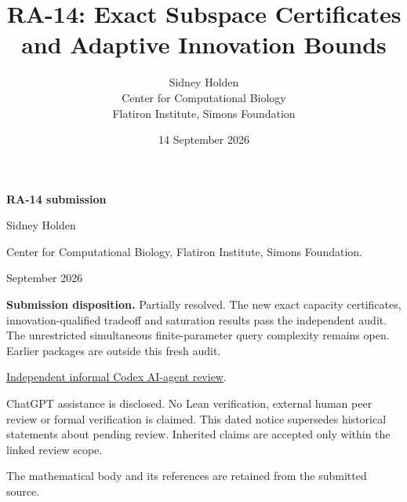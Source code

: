 \documentclass[11pt]{article}
\title{RA-14: Exact Subspace Certificates and Adaptive Innovation Bounds}
\author{Sidney Holden\\{\small Center for Computational Biology}\\{\small Flatiron Institute, Simons Foundation}}
\date{14 September 2026}
\theoremstyle{definition}
\begin{document}
\begin{titlepage}
\thispagestyle{empty}
{\LARGE\bfseries RA-14 submission}\par\bigskip
{\Large Sidney Holden}\par\medskip
Center for Computational Biology, Flatiron Institute, Simons Foundation.\par{} September 2026\par\bigskip
\textbf{Submission disposition.} Partially resolved. The new exact capacity certificates, innovation-qualified tradeoff and saturation results pass the independent audit. The unrestricted simultaneous finite-parameter query complexity remains open. Earlier packages are outside this fresh audit.\par\bigskip
\href{https://github.com/ajt60gaibb/OpenProblemsInNLA/blob/main/reviews/2026-09-14-further-submissions/RA-14-review.md}{Independent informal Codex AI-agent review}.\par\medskip
ChatGPT assistance is disclosed. No Lean verification, external human peer review or formal verification is claimed. This dated notice supersedes historical statements about pending review. Inherited claims are accepted only within the linked review scope.\par\bigskip
The mathematical body and its references are retained from the submitted source.\par
\end{titlepage}

\maketitle
\end{document}
